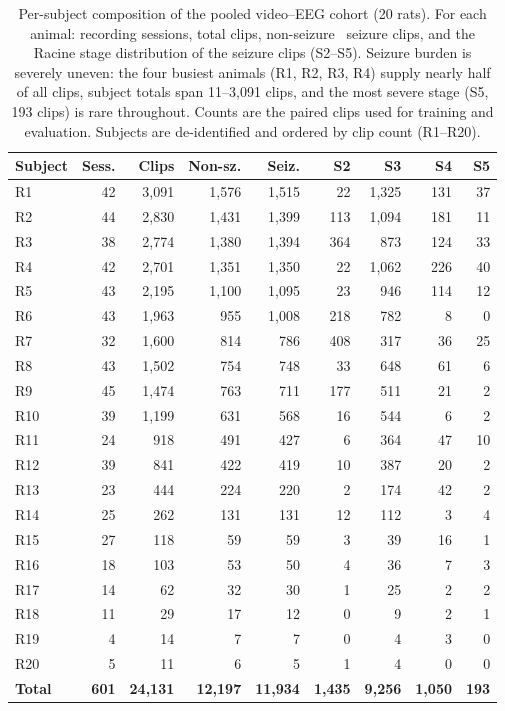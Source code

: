 \begin{table}[t]
\centering
\caption{Per-subject composition of the pooled video--EEG cohort (20 rats). For each animal: recording sessions, total clips, non-seizure \vs\ seizure clips,
and the Racine stage distribution of the seizure clips (S2--S5). Seizure burden is
severely uneven: the four busiest animals (R1, R2, R3, R4) supply
nearly half of all clips, subject totals span 11--3{,}091 clips, and the most
severe stage (S5, 193 clips) is rare throughout. Counts are the paired clips used
for training and evaluation. Subjects are de-identified and ordered by clip count
(R1--R20).}
\label{tab:cohort}
\setlength{\tabcolsep}{5pt}
\renewcommand{\arraystretch}{1.05}
\small
\begin{tabular}{@{}l r r r r r r r r@{}}
\toprule
\textbf{Subject} & \textbf{Sess.} & \textbf{Clips} & \textbf{Non-sz.} & \textbf{Seiz.} & \textbf{S2} & \textbf{S3} & \textbf{S4} & \textbf{S5} \\
\midrule
R1 & 42 & 3{,}091 & 1{,}576 & 1{,}515 & 22 & 1{,}325 & 131 & 37 \\
R2 & 44 & 2{,}830 & 1{,}431 & 1{,}399 & 113 & 1{,}094 & 181 & 11 \\
R3 & 38 & 2{,}774 & 1{,}380 & 1{,}394 & 364 & 873 & 124 & 33 \\
R4 & 42 & 2{,}701 & 1{,}351 & 1{,}350 & 22 & 1{,}062 & 226 & 40 \\
R5 & 43 & 2{,}195 & 1{,}100 & 1{,}095 & 23 & 946 & 114 & 12 \\
R6 & 43 & 1{,}963 & 955 & 1{,}008 & 218 & 782 & 8 & 0 \\
R7 & 32 & 1{,}600 & 814 & 786 & 408 & 317 & 36 & 25 \\
R8 & 43 & 1{,}502 & 754 & 748 & 33 & 648 & 61 & 6 \\
R9 & 45 & 1{,}474 & 763 & 711 & 177 & 511 & 21 & 2 \\
R10 & 39 & 1{,}199 & 631 & 568 & 16 & 544 & 6 & 2 \\
R11 & 24 & 918 & 491 & 427 & 6 & 364 & 47 & 10 \\
R12 & 39 & 841 & 422 & 419 & 10 & 387 & 20 & 2 \\
R13 & 23 & 444 & 224 & 220 & 2 & 174 & 42 & 2 \\
R14 & 25 & 262 & 131 & 131 & 12 & 112 & 3 & 4 \\
R15 & 27 & 118 & 59 & 59 & 3 & 39 & 16 & 1 \\
R16 & 18 & 103 & 53 & 50 & 4 & 36 & 7 & 3 \\
R17 & 14 & 62 & 32 & 30 & 1 & 25 & 2 & 2 \\
R18 & 11 & 29 & 17 & 12 & 0 & 9 & 2 & 1 \\
R19 & 4 & 14 & 7 & 7 & 0 & 4 & 3 & 0 \\
R20 & 5 & 11 & 6 & 5 & 1 & 4 & 0 & 0 \\
\midrule
\textbf{Total} & \textbf{601} & \textbf{24{,}131} & \textbf{12{,}197} & \textbf{11{,}934} & \textbf{1{,}435} & \textbf{9{,}256} & \textbf{1{,}050} & \textbf{193} \\
\bottomrule
\end{tabular}
\end{table}

